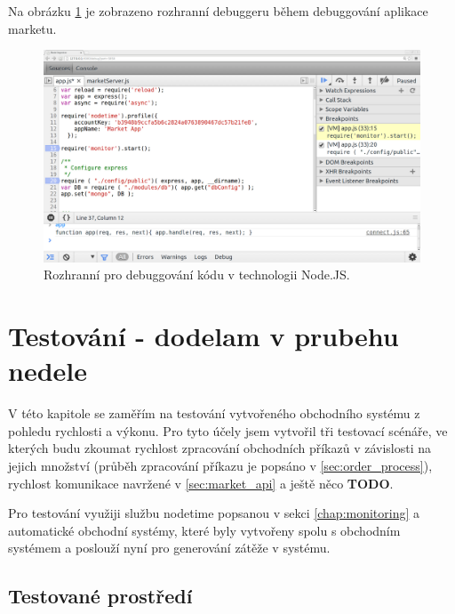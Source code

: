 \documentclass[thesis=M,czech]{FITthesis}[2012/06/26]
\begin{document}
	Na obrázku \ref{fig:debugger} je zobrazeno rozhranní debuggeru během debuggování aplikace marketu.
	
\begin{figure}[h]
	\centering
	\includegraphics[width=1\textwidth]{images/node_inspector}
 	\caption[Prostředí modulu pro ladění kódu v Node.JS]{Rozhranní pro debuggování kódu v technologii Node.JS.}
 	\label{fig:debugger}
\end{figure}



\chapter{Testování - dodelam v prubehu nedele}
\label{chap:testing}
	
	V této kapitole se zaměřím na testování vytvořeného obchodního systému z pohledu rychlosti a výkonu. Pro tyto účely jsem vytvořil tři testovací scénáře, ve kterých budu zkoumat rychlost zpracování obchodních příkazů v závislosti na jejich množství (průběh zpracování příkazu je popsáno v \ref{sec:order_process}), rychlost komunikace navržené v \ref{sec:market_api} a ještě něco \textbf{TODO}.
	
	Pro testování využiji službu nodetime popsanou v sekci \ref{chap:monitoring} a automatické obchodní systémy, které byly vytvořeny spolu s obchodním systémem a poslouží nyní pro generování zátěže v systému.
	
	
\section{Testované prostředí}
	
\end{document}
